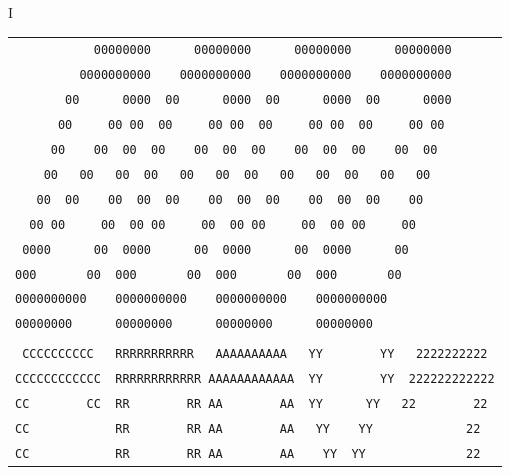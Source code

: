 {\ttfamily{}\quad I}
{\scriptsize\begin{tabular}{l}
\texttt{\ \ \ \ \ \ \ \ \ \ \ 00000000\ \ \ \ \ \ 00000000\ \ \ \ \ \ 00000000\ \ \ \ \ \ 00000000}\\
\texttt{\ \ \ \ \ \ \ \ \ 0000000000\ \ \ \ 0000000000\ \ \ \ 0000000000\ \ \ \ 0000000000}\\
\texttt{\ \ \ \ \ \ \ 00\ \ \ \ \ \ 0000\ \ 00\ \ \ \ \ \ 0000\ \ 00\ \ \ \ \ \ 0000\ \ 00\ \ \ \ \ \ 0000}\\
\texttt{\ \ \ \ \ \ 00\ \ \ \ \ 00\ 00\ \ 00\ \ \ \ \ 00\ 00\ \ 00\ \ \ \ \ 00\ 00\ \ 00\ \ \ \ \ 00\ 00}\\
\texttt{\ \ \ \ \ 00\ \ \ \ 00\ \ 00\ \ 00\ \ \ \ 00\ \ 00\ \ 00\ \ \ \ 00\ \ 00\ \ 00\ \ \ \ 00\ \ 00}\\
\texttt{\ \ \ \ 00\ \ \ 00\ \ \ 00\ \ 00\ \ \ 00\ \ \ 00\ \ 00\ \ \ 00\ \ \ 00\ \ 00\ \ \ 00\ \ \ 00}\\
\texttt{\ \ \ 00\ \ 00\ \ \ \ 00\ \ 00\ \ 00\ \ \ \ 00\ \ 00\ \ 00\ \ \ \ 00\ \ 00\ \ 00\ \ \ \ 00}\\
\texttt{\ \ 00\ 00\ \ \ \ \ 00\ \ 00\ 00\ \ \ \ \ 00\ \ 00\ 00\ \ \ \ \ 00\ \ 00\ 00\ \ \ \ \ 00}\\
\texttt{\ 0000\ \ \ \ \ \ 00\ \ 0000\ \ \ \ \ \ 00\ \ 0000\ \ \ \ \ \ 00\ \ 0000\ \ \ \ \ \ 00}\\
\texttt{000\ \ \ \ \ \ \ 00\ \ 000\ \ \ \ \ \ \ 00\ \ 000\ \ \ \ \ \ \ 00\ \ 000\ \ \ \ \ \ \ 00}\\
\texttt{0000000000\ \ \ \ 0000000000\ \ \ \ 0000000000\ \ \ \ 0000000000}\\
\texttt{00000000\ \ \ \ \ \ 00000000\ \ \ \ \ \ 00000000\ \ \ \ \ \ 00000000}\\
\texttt{}\\
\texttt{\ CCCCCCCCCC\ \ \ RRRRRRRRRRR\ \ \ AAAAAAAAAA\ \ \ YY\ \ \ \ \ \ \ \ YY\ \ \ 2222222222}\\
\texttt{CCCCCCCCCCCC\ \ RRRRRRRRRRRR\ AAAAAAAAAAAA\ \ YY\ \ \ \ \ \ \ \ YY\ \ 222222222222}\\
\texttt{CC\ \ \ \ \ \ \ \ CC\ \ RR\ \ \ \ \ \ \ \ RR\ AA\ \ \ \ \ \ \ \ AA\ \ YY\ \ \ \ \ \ YY\ \ \ 22\ \ \ \ \ \ \ \ 22}\\
\texttt{CC\ \ \ \ \ \ \ \ \ \ \ \ RR\ \ \ \ \ \ \ \ RR\ AA\ \ \ \ \ \ \ \ AA\ \ \ YY\ \ \ \ YY\ \ \ \ \ \ \ \ \ \ \ \ \ 22}\\
\texttt{CC\ \ \ \ \ \ \ \ \ \ \ \ RR\ \ \ \ \ \ \ \ RR\ AA\ \ \ \ \ \ \ \ AA\ \ \ \ YY\ \ YY\ \ \ \ \ \ \ \ \ \ \ \ \ \ 22}\\

\end{tabular}}
